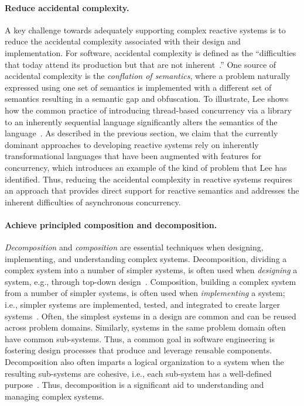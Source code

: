 \paragraph{Reduce accidental complexity.}
A key challenge towards adequately supporting complex reactive systems is to reduce the accidental complexity associated with their design and implementation.
For software, accidental complexity is defined as the ``difficulties that today attend its production but that are not inherent~\cite{brooks1995mythical}.''
One source of accidental complexity is the \emph{conflation of semantics}, where a problem naturally expressed using one set of semantics is implemented with a different set of semantics resulting in a semantic gap and obfuscation.
To illustrate, Lee shows how the common practice of introducing thread-based concurrency via a library to an inherently sequential language significantly alters the semantics of the language~\cite{lee2006problem}.
As described in the previous section, we claim that the currently dominant approaches to developing reactive systems rely on inherently transformational languages that have been augmented with features for concurrency, which introduces an example of the kind of problem that Lee has identified.
Thus, reducing the accidental complexity in reactive systems requires an approach that provides direct support for reactive semantics and addresses the inherent difficulties of asynchronous concurrency.

\paragraph{Achieve principled composition and decomposition.}
\emph{Decomposition} and \emph{composition} are essential techniques when designing, implementing, and understanding complex systems.
Decomposition, dividing a complex system into a number of simpler systems, is often used when \emph{designing} a system, e.g., through top-down design~\cite{wirth1971program}.
Composition, building a complex system from a number of simpler systems, is often used when \emph{implementing} a system; i.e., simpler systems are implemented, tested, and integrated to create larger systems~\cite{brooks1995mythical}.
Often, the simplest systems in a design are common and can be reused across problem domains.
Similarly, systems in the same problem domain often have common sub-systems.
Thus, a common goal in software engineering is fostering design processes that produce and leverage reusable components.
Decomposition also often imparts a logical organization to a system when the resulting sub-systems are cohesive, i.e., each sub-system has a well-defined purpose~\cite{parnas1972criteria}.
Thus, decomposition is a significant aid to understanding and managing complex systems.

